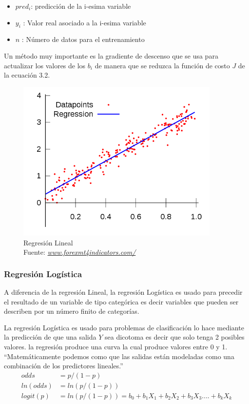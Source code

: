 \begin{itemize}
	\item $pred_{i}$: predicción de la i-esima variable
	\item $y_{i}$   : Valor real asociado a la i-esima variable
	\item $n$       : Número de datos para el entrenamiento
	
\end{itemize}
Un método muy importante es la gradiente de descenso que se usa para actualizar los valores de los $b_{i}$ de manera que se reduzca la función de costo $J$ de la ecuación 3.2.
\begin{figure}[H]
	\centering
	\includegraphics[width=0.9\textwidth]{Figures/Linear.png}
	\caption{Regresión Lineal \\ Fuente:  \href{https://www.forexmt4indicators.com/linear-regression-mt4-indicator/}{\textit{www.forexmt4indicators.com/}}}
	\label{Regresión Lineal}
\end{figure} 

\subsubsection*{Regresión Logística}
A diferencia de la regresión Lineal, la regresión Logística es usado para precedir el resultado de un variable de tipo categórica es decir variables que pueden ser describen por un número finito de categorías.

 La regresión Logística es usado para problemas de clasificación lo hace mediante la predicción de que una salida $Y$ sea dicotoma es decir que solo tenga 2 posibles valores.
 la regresión produce una curva la cual produce valores entre 0 y 1.
 \textquotedblleft Matemáticamente podemos como que las salidas están modeladas como una combinación de los predictores lineales.\textquotedblright \cite{WEBSITE:6}
 \begin{equation}
 \label{eq:t}
 \begin{aligned}
 odds &= p/ (1-p)\\ 
 ln(odds) &= ln(p/(1-p))\\      
 logit(p) &= ln(p/(1-p)) = b_{0}+b_{1}X_{1}+b_{2}X_{2}+b_{3}X_{3}....+b_{k}X_{k}
 \end{aligned}
 \end{equation}
 
